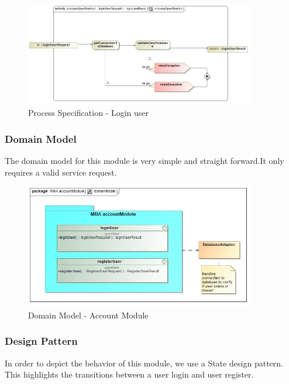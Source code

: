 \documentclass[hidelinks, 12pt, oneside]{article}
\begin{document}
		
		\begin{figure}[!htbp]
    		\centering
    		\includegraphics[width=0.9\textwidth]{img/processSpecificationLoginUser.jpg}
    		\caption{Process Specification - Login user}
    		\label{fig:ProcessSpec_loginUser}
		\end{figure}
		\newpage
		
		\subsubsection{Domain Model}
		The domain model for this module is very simple and straight forward.It only requires a valid service request.
		
		
		\begin{figure}[!htbp]
    		\centering
    		\includegraphics[width=0.9\textwidth]{img/DomainModelAccountModule.jpg}
    		\caption{Domain Model - Account Module}
    		\label{fig:DomainMod_accountModule}
		\end{figure}
		\newpage
				
		\subsubsection{Design Pattern}
		In order to depict the behavior of this module, we use a State design pattern. This highlights the transitions 
		between a user login and user register.
		
\end{document}
